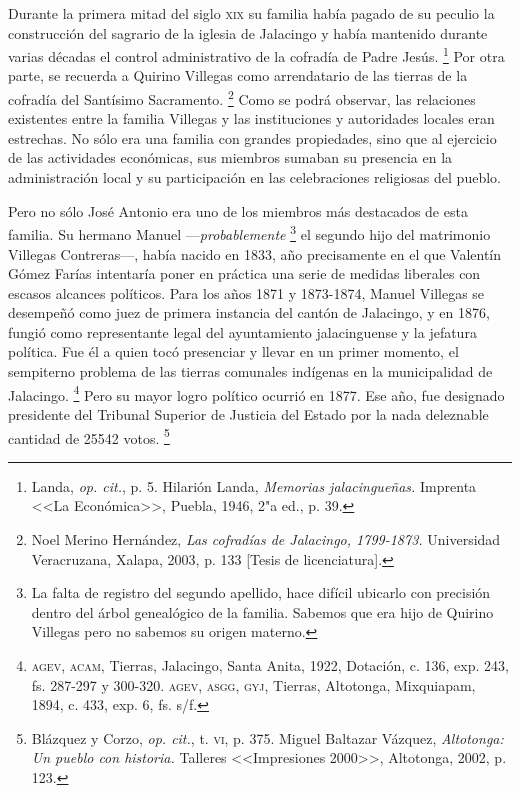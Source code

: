 \documentclass[14pt,twoside,final]{extbook} %
\let\oldfootnote\footnote
\renewcommand\footnote[1]{%
\oldfootnote{\hspace{1mm}#1}}
\begin{document}
Durante la primera mitad del siglo \textsc{xix} su familia había pagado de su peculio la construcción del sagrario de la iglesia de Jalacingo y había mantenido durante varias décadas el control administrativo de la cofradía de Padre Jesús.\footnote{Landa, \emph{op. cit.}, p. 5. Hilarión Landa, \emph{Memorias jalacingueñas.} Imprenta <<La Económica>>, Puebla, 1946, 2"a ed., p. 39.} Por otra parte, se recuerda a Quirino Villegas como arrendatario de las tierras de la cofradía del Santísimo Sacramento.\footnote{Noel Merino Hernández, \emph{Las cofradías de Jalacingo, 1799-1873.} Universidad Veracruzana, Xalapa, 2003, p. 133 [Tesis de licenciatura].} Como se podrá observar, las relaciones existentes entre la familia Villegas y las instituciones y autoridades locales eran estrechas. No sólo era una familia con grandes propiedades, sino que al ejercicio de las actividades económicas, sus miembros sumaban su presencia en la administración local y su participación en las celebraciones religiosas del pueblo.

Pero no sólo José Antonio era uno de los miembros más destacados de esta familia. Su hermano Manuel ---\emph{probablemente}\footnote{La falta de registro del segundo apellido, hace difícil ubicarlo con precisión dentro del árbol genealógico de la familia. Sabemos que era hijo de Quirino Villegas pero no sabemos su origen materno.} el segundo hijo del matrimonio Villegas Contreras---, había nacido en 1833, año precisamente en el que Valentín Gómez Farías intentaría poner en práctica una serie de medidas liberales con escasos alcances políticos. Para los años 1871 y 1873-1874, Manuel Villegas se desempeñó como juez de primera instancia del cantón de Jalacingo, y en 1876, fungió como representante legal del ayuntamiento jalacinguense y la jefatura política. Fue él a quien tocó presenciar y llevar en un primer momento, el sempiterno problema de las tierras comunales indígenas en la municipalidad de Jalacingo.\footnote{\textsc{agev, acam}, Tierras, Jalacingo, Santa Anita, 1922, Dotación, c. 136, exp. 243, fs. 287-297 y 300-320. \textsc{agev, asgg, gyj}, Tierras, Altotonga, Mixquiapam, 1894, c. 433, exp. 6, fs. s/f.} Pero su mayor logro político ocurrió en 1877. Ese año, fue designado presidente del Tribunal Superior de Justicia del Estado por la nada deleznable cantidad de 25542 votos.\footnote{Blázquez y Corzo, \emph{op. cit.}, t. \textsc{vi}, p. 375. Miguel Baltazar Vázquez, \emph{Altotonga: Un pueblo con historia.} Talleres <<Impresiones 2000>>, Altotonga, 2002, p. 123.}
\end{document}
